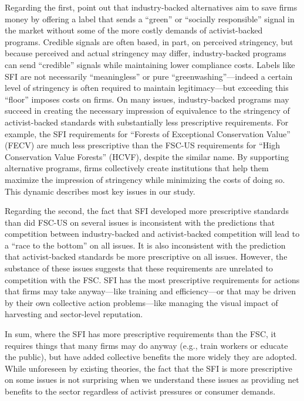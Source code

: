 \documentclass[
      12pt,
            Review ]{article}
\begin{document}
Regarding the first, \citet{Cashore2004} point out that industry-backed
alternatives aim to save firms money by offering a label that sends a
``green'' or ``socially responsible'' signal in the market without some
of the more costly demands of activist-backed programs. Credible signals
are often based, in part, on perceived stringency, but because perceived
and actual stringency may differ, industry-backed programs can send
``credible'' signals while maintaining lower compliance costs. Labels
like SFI are not necessarily ``meaningless'' or pure
``greenwashing''---indeed a certain level of stringency is often
required to maintain legitimacy---but exceeding this ``floor'' imposes
costs on firms. On many issues, industry-backed programs may succeed in
creating the necessary impression of equivalence to the stringency of
activist-backed standards with substantially less prescriptive
requirements. For example, the SFI requirements for ``Forests of
Exceptional Conservation Value'' (FECV) are much less prescriptive than
the FSC-US requirements for ``High Conservation Value Forests'' (HCVF),
despite the similar name. By supporting alternative programs, firms
collectively create institutions that help them maximize the impression
of stringency while minimizing the costs of doing so. This dynamic
describes most key issues in our study.

Regarding the second, the fact that SFI developed more prescriptive
standards than did FSC-US on several issues is inconsistent with the
predictions that competition between industry-backed and activist-backed
competition will lead to a ``race to the bottom'' on all issues. It is
also inconsistent with the prediction that activist-backed standards be
more prescriptive on all issues. However, the substance of these issues
suggests that these requirements are unrelated to competition with the
FSC. SFI has the most prescriptive requirements for actions that firms
may take anyway---like training and efficiency---or that may be driven
by their own collective action problems---like managing the visual
impact of harvesting and sector-level reputation.

In sum, where the SFI has more prescriptive requirements than the FSC,
it requires things that many firms may do anyway (e.g., train workers or
educate the public), but have added collective benefits the more widely
they are adopted. While unforeseen by existing theories, the fact that
the SFI is more prescriptive on some issues is not surprising when we
understand these issues as providing net benefits to the sector
regardless of activist pressures or consumer demands.
\end{document}
